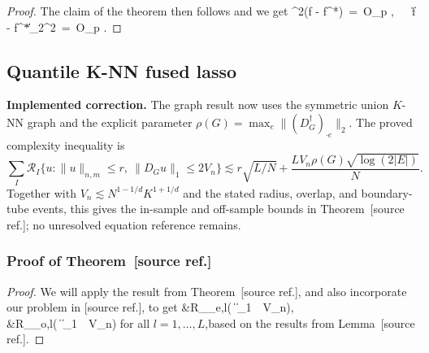 \documentclass[twoside,11pt]{article}
\makeatletter
\newcommand{\implementedchange}[1]{%
  \par\smallskip\noindent
  {\color{revisionred}\textbf{Implemented correction.} #1}%
  \par\smallskip}
\newcommand{\discardlabel}[1]{}
\newcommand{\discardtwo}[2]{}
\newcommand{\legacyref}[1]{\textup{[source ref.]}}
\newcommand{\legacyeqref}[1]{\textup{[source equation]}}
\newenvironment{legacycomparison}{%
  \begingroup\color{legacygray}%
  \let\label\discardlabel
  \let\originallabel\discardlabel
  \let\ref\legacyref
  \let\pageref\legacyref
  \let\eqref\legacyeqref
  \let\cref\legacyref
  \let\Cref\legacyref
  \let\autoref\legacyref
  \let\aliasref\discardtwo
}{\endgroup}
\newcommand{\aliasref}[2]{%
  \@ifundefined{r@#2}{}{%
    \expandafter\let\csname r@#1\expandafter\endcsname\csname r@#2\endcsname}}
\makeatother
\begin{document}
\begin{legacycomparison}
\begin{proof}
The claim of the theorem then follows and we get 
\bea 
\Delta^2(\hat f - f^*) \,=\, O_p , \,\,\,\,\,\,
\bea    
\bea 
\left\|\hat f - f^*\right\|_2^2 \,=\, O_p .
\bea  
\end{proof}

\subsection{Quantile K-NN fused lasso}

\implementedchange{The graph result now uses the symmetric union $K$-NN graph and the explicit parameter $\rho(G)=\max_e\|(D_G^\dagger)_{\cdot e}\|_2$. The proved complexity inequality is
\[
\sum_I\mathcal R_I\{u:\|u\|_{n,m}\le r,\ \|D_Gu\|_1\le2V_n\}
\lesssim r\sqrt{L/N}+\frac{LV_n\rho(G)\sqrt{\log(2|E|)}}{N}.
\]
Together with $V_n\lesssim N^{1-1/d}K^{1+1/d}$ and the stated radius, overlap, and boundary-tube events, this gives the in-sample and off-sample bounds in Theorem~\ref{Theorem_5}; no unresolved equation reference remains.}

\subsubsection{Proof of  Theorem~\ref{Theorem_5}}
\begin{proof}
   We will apply the result from Theorem~\ref{Theorem_1}, and also incorporate our problem in \ref{def_knn}, to get 
\bea 
&R_{_{e,l}}\left( \| \theta\|_1 \,\leq\, V_n\cap {}\right), \quad \\  &R_{_{o,l}}\left( \| \theta\|_1 \,\leq\, V_n\cap {}\right) 
\bea for all $l = 1, \dots, L$,based on the results from Lemma~\ref{lemma_35}. 


\end{proof}
\end{legacycomparison}
\end{document}
